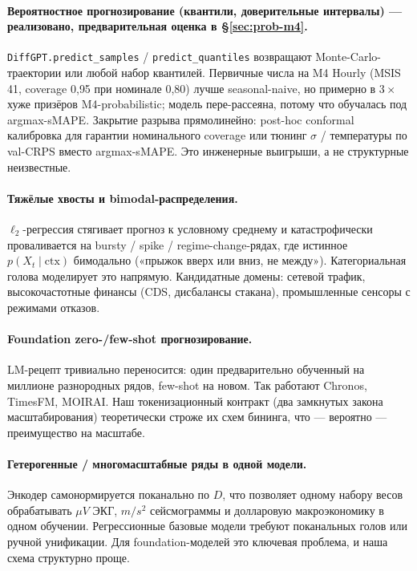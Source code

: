 \documentclass[11pt]{article}
\theoremstyle{remark}
\begin{document}
\paragraph{Вероятностное прогнозирование (квантили, доверительные
интервалы) --- реализовано, предварительная оценка в \S\ref{sec:prob-m4}.}
\texttt{DiffGPT.predict\_samples} / \texttt{predict\_quantiles}
возвращают Monte-Carlo-траектории или любой набор квантилей.
Первичные числа на M4 Hourly (MSIS 41, coverage 0{,}95 при номинале
0{,}80) лучше seasonal-naive, но примерно в $3\times$ хуже призёров
M4-probabilistic; модель пере-рассеяна, потому что обучалась под
argmax-sMAPE. Закрытие разрыва прямолинейно: post-hoc conformal
калибровка для гарантии номинального coverage или тюнинг $\sigma$ /
температуры по val-CRPS вместо argmax-sMAPE. Это инженерные выигрыши,
а не структурные неизвестные.

\paragraph{Тяжёлые хвосты и bimodal-распределения.}
$\ell_2$-регрессия стягивает прогноз к условному среднему и
катастрофически проваливается на bursty / spike / regime-change-рядах,
где истинное $p(X_t \mid \mathrm{ctx})$ бимодально («прыжок вверх или
вниз, не между»). Категориальная голова моделирует это напрямую.
Кандидатные домены: сетевой трафик, высокочастотные финансы (CDS,
дисбалансы стакана), промышленные сенсоры с режимами отказов.

\paragraph{Foundation zero-/few-shot прогнозирование.}
LM-рецепт тривиально переносится: один предварительно обученный на
миллионе разнородных рядов, few-shot на новом. Так работают Chronos,
TimesFM, MOIRAI. Наш токенизационный контракт (два замкнутых закона
масштабирования) теоретически строже их схем бининга, что --- вероятно
--- преимущество на масштабе.

\paragraph{Гетерогенные / многомасштабные ряды в одной модели.}
Энкодер самонормируется поканально по $D$, что позволяет одному набору
весов обрабатывать $\mu V$ ЭКГ, $m/s^2$ сейсмограммы и долларовую
макроэкономику в одном обучении. Регрессионные базовые модели требуют
поканальных голов или ручной унификации. Для foundation-моделей это
ключевая проблема, и наша схема структурно проще.
\end{document}
